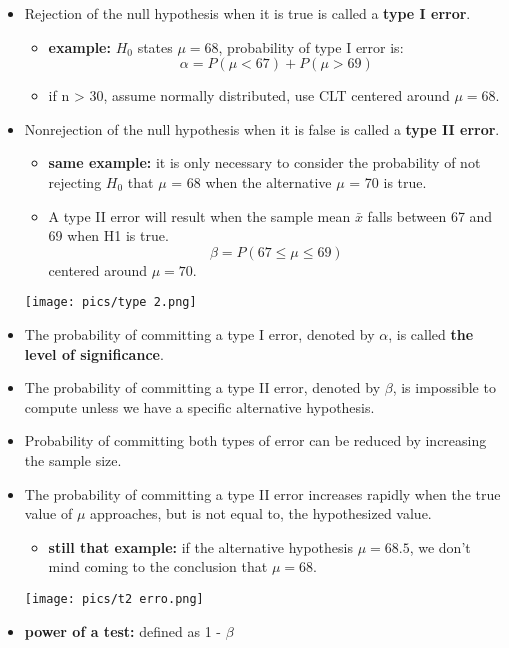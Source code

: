 \documentclass[10pt, letterpaper, twoside]{article}
\newenvironment{Figure}
  {\par\medskip\noindent\minipage{\linewidth}}
  {\endminipage\par\medskip}
\begin{document}
\begin{multicols}{2}
\begin{itemize}
    \item Rejection of the null hypothesis when it is true is called a \textbf{type I error}.
    \begin{itemize}
        \item \textbf{example:} $H_0$ states $\mu = 68$, probability of type I error is:
        \begin{equation*}
            \alpha = P(\mu < 67) + P(\mu > 69)
        \end{equation*}
        \item if n > 30, assume normally distributed, use CLT centered around $\mu = 68$.
    \end{itemize}
    \item Nonrejection of the null hypothesis when it is false is called a \textbf{type II error}.
    \begin{itemize}
        \item \textbf{same example:} it is only necessary to
consider the probability of not rejecting $H_0$ that $\mu$ = 68 when the alternative $\mu$ = 70 is true. 
        \item A type II error will result when the sample mean $\bar{x}$ falls between 67 and 69 when H1 is true.
        \begin{equation*}
            \beta = P(67 \leq \mu \leq 69)
        \end{equation*}
        centered around $\mu = 70$.
    \end{itemize}
    \begin{Figure}
        \texttt{[image: pics/type 2.png]}
    \end{Figure}
    \item The probability of committing a type I error, denoted by $\alpha$, is called \textbf{the level of significance}.
    \item The probability of committing a type II error, denoted by $\beta$, is impossible to compute unless we have a specific alternative hypothesis.
    \item Probability of committing both types of error can be reduced by increasing the sample size.
    \item The probability of committing a type II error increases rapidly when the true value of $\mu$ approaches, but is not equal to, the hypothesized value.
    \begin{itemize}
        \item \textbf{still that example:} if the alternative hypothesis $\mu = 68.5$, we don't mind coming to the conclusion that $\mu = 68$.
    \end{itemize}
    \begin{Figure}
        \texttt{[image: pics/t2 erro.png]}
    \end{Figure}
    \item \textbf{power of a test:} defined as 1 - $\beta$
\end{itemize}


\end{multicols}
\end{document}

